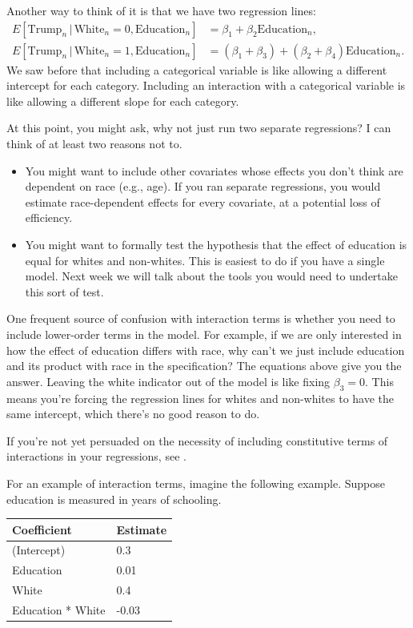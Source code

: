 \documentclass[
  12pt,
  oneside,openany]{book}
\begin{document}
Another way to think of it is that we have two regression lines:
\[
\begin{aligned}
  E[\text{Trump}_n \,|\, \text{White}_n = 0, \text{Education}_n] &= \beta_1 + \beta_2 \text{Education}_n, \\
  E[\text{Trump}_n \,|\, \text{White}_n = 1, \text{Education}_n] &= (\beta_1 + \beta_3) + (\beta_2 + \beta_4) \text{Education}_n.
\end{aligned}
\]
We saw before that including a categorical variable is like allowing a different intercept for each category. Including an interaction with a categorical variable is like allowing a different slope for each category.

At this point, you might ask, why not just run two separate regressions? I can think of at least two reasons not to.

\begin{itemize}
\item
  You might want to include other covariates whose effects you don't think are dependent on race (e.g., age). If you ran separate regressions, you would estimate race-dependent effects for every covariate, at a potential loss of efficiency.
\item
  You might want to formally test the hypothesis that the effect of education is equal for whites and non-whites. This is easiest to do if you have a single model. Next week we will talk about the tools you would need to undertake this sort of test.
\end{itemize}

One frequent source of confusion with interaction terms is whether you need to include lower-order terms in the model. For example, if we are only interested in how the effect of education differs with race, why can't we just include education and its product with race in the specification? The equations above give you the answer. Leaving the white indicator out of the model is like fixing \(\beta_3 = 0\). This means you're forcing the regression lines for whites and non-whites to have the same intercept, which there's no good reason to do.

If you're not yet persuaded on the necessity of including constitutive terms of interactions in your regressions, see \citet{braumoeller2004hypothesis}.

For an example of interaction terms, imagine the following example. Suppose education is measured in years of schooling.

\begin{longtable}[]{@{}ll@{}}
\toprule
Coefficient & Estimate\tabularnewline
\midrule
\endhead
(Intercept) & 0.3\tabularnewline
Education & 0.01\tabularnewline
White & 0.4\tabularnewline
Education * White & -0.03\tabularnewline
\bottomrule
\end{longtable}
\end{document}
